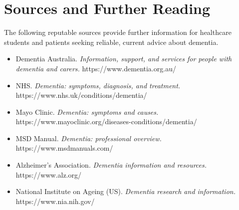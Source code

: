 \section*{Sources and Further Reading}
The following reputable sources provide further information for healthcare students and patients seeking reliable, current advice about dementia.

\begin{itemize}
    \item Dementia Australia. \textit{Information, support, and services for people with dementia and carers.} https://www.dementia.org.au/
    \item NHS. \textit{Dementia: symptoms, diagnosis, and treatment.} https://www.nhs.uk/conditions/dementia/
    \item Mayo Clinic. \textit{Dementia: symptoms and causes.} https://www.mayoclinic.org/diseases-conditions/dementia/
    \item MSD Manual. \textit{Dementia: professional overview.} https://www.msdmanuals.com/
    \item Alzheimer's Association. \textit{Dementia information and resources.} https://www.alz.org/
    \item National Institute on Ageing (US). \textit{Dementia research and information.} https://www.nia.nih.gov/
\end{itemize}
